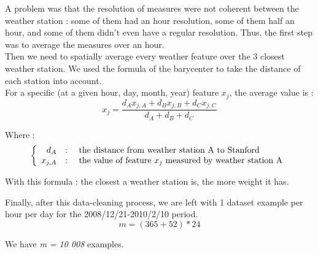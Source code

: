 \documentclass[]{report}
\begin{document}
	A problem was that the resolution of measures were not coherent between the weather station : some of them had an hour resolution, some of them half an hour, and some of them didn't even have a regular resolution. Thus, the first step was to average the measures over an hour.\\
	
	Then we need to spatially average every weather feature over the 3 closest weather station. We used the formula of the barycenter to take the distance of each station into account.\\
	
	For a specific (at a given hour, day, month, year) feature $x_j$, the average value is :
	\[x_j = \frac{d_A x_{j,A} + d_B x_{j,B} + d_C x_{j,C}}{d_A + d_B + d_C}\]
	
	Where :
	\[ \left\{
	\begin{array}{r c l}
		d_A &:& \text{ the distance from weather station A to Stanford}\\
		x_{j,A} &:& \text{ the value of feature $x_j$ measured by weather station A}\\
	\end{array}
	\right. \]
	
	With this formula : the closest a weather station is, the more weight it has.
	
	Finally, after this data-cleaning process, we are left with 1 dataset example per hour per day for the 2008/12/21-2010/2/10 period.
	\[m = (365+52)*24\]
	
	We have \emph{m = 10 008} examples.
\end{document}
